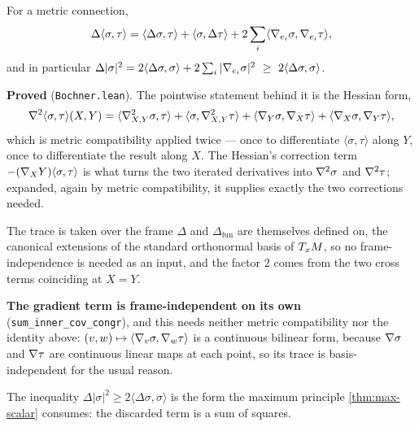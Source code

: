 \begin{theorem}
  \label{thm:bochner}
  \leanok
  For a metric connection,
  \[
    \Delta \langle \sigma, \tau\rangle
      = \langle \Delta\sigma, \tau\rangle + \langle \sigma, \Delta\tau\rangle
        + 2\sum_i \langle \nabla_{e_i}\sigma, \nabla_{e_i}\tau\rangle,
  \]
  and in particular $\Delta |\sigma|^2 = 2\langle \Delta\sigma,\sigma\rangle +
  2\sum_i |\nabla_{e_i}\sigma|^2 \ \ge\ 2\langle \Delta\sigma,\sigma\rangle$.

  \textbf{Proved} (\texttt{Bochner.lean}). The pointwise statement behind it is
  the Hessian form,
  \[
    \nabla^2\langle\sigma,\tau\rangle(X,Y)
      = \langle \nabla^2_{X,Y}\sigma, \tau\rangle
      + \langle \sigma, \nabla^2_{X,Y}\tau\rangle
      + \langle \nabla_Y\sigma, \nabla_X\tau\rangle
      + \langle \nabla_X\sigma, \nabla_Y\tau\rangle,
  \]
  which is metric compatibility applied twice --- once to differentiate
  $\langle\sigma,\tau\rangle$ along $Y$, once to differentiate the result along
  $X$. The Hessian's correction term $-(\nabla_X Y)\langle\sigma,\tau\rangle$ is
  what turns the two iterated derivatives into $\nabla^2\sigma$ and
  $\nabla^2\tau$; expanded, again by metric compatibility, it supplies exactly
  the two corrections needed.

  The trace is taken over the frame $\Delta$ and $\Delta_{\text{fun}}$ are
  themselves defined on, the canonical extensions of the standard orthonormal
  basis of $T_xM$, so no frame-independence is needed as an input, and the
  factor $2$ comes from the two cross terms coinciding at $X = Y$.

  \textbf{The gradient term is frame-independent on its own}
  (\texttt{sum\_inner\_cov\_congr}), and this needs neither metric
  compatibility nor the identity above: $(v,w) \mapsto \langle \nabla_v\sigma,
  \nabla_w\tau\rangle$ is a continuous bilinear form, because $\nabla\sigma$ and
  $\nabla\tau$ are continuous linear maps at each point, so its trace is
  basis-independent for the usual reason.

  The inequality $\Delta|\sigma|^2 \ge 2\langle\Delta\sigma,\sigma\rangle$ is
  the form the maximum principle \ref{thm:max-scalar} consumes: the discarded
  term is a sum of squares.
\end{theorem}

